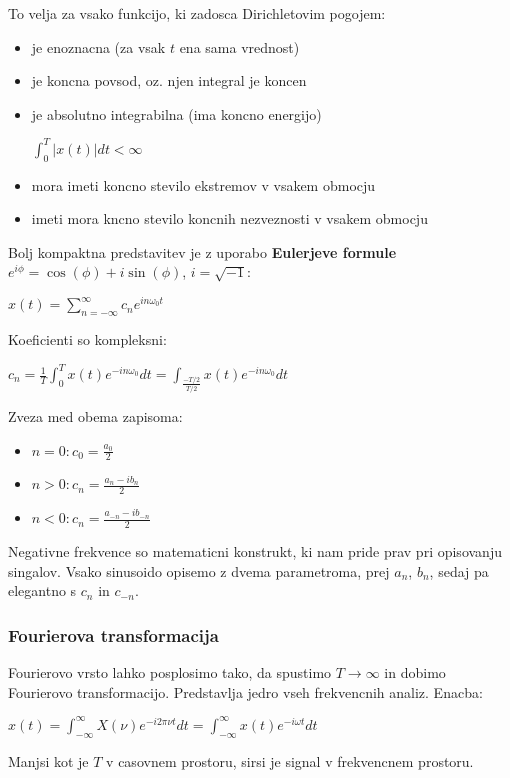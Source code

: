 \documentclass{article}
\begin{document}
\begin{multicols}{2}
	To velja za vsako funkcijo, ki zadosca Dirichletovim pogojem:
	\begin{itemize}
		\item je enoznacna (za vsak $t$ ena sama vrednost)
		\item je koncna povsod, oz. njen integral je koncen
		\item je absolutno integrabilna (ima koncno energijo)
		      \begin{center}
			      $\int_0^T |x(t)| dt < \infty$
		      \end{center}
		\item mora imeti koncno stevilo ekstremov v vsakem obmocju
		\item imeti mora kncno stevilo koncnih nezveznosti v vsakem obmocju
	\end{itemize}

	Bolj kompaktna predstavitev je z uporabo \textbf{Eulerjeve formule} $e^{i \phi} = \cos(\phi) + i \sin(\phi)$, $i = \sqrt{-1}$:
	\begin{center}
		\begin{math}
			x(t) = \sum_{n = - \infty}^{\infty} c_n e^{i n \omega_0 t}
		\end{math}
	\end{center}
	Koeficienti so kompleksni:
	\begin{center}
		\begin{math}
			c_n = \frac{1}{T} \int_0^T x(t)e^{-in \omega_0} dt = \int_{\frac{-T/2}{T/2}} x(t) e^{-in \omega_0} dt
		\end{math}
	\end{center}
	Zveza med obema zapisoma:
	\begin{itemize}
		\item $n = 0: c_0 = \frac{a_0}{2}$
		\item $n > 0: c_n = \frac{a_n - i b_n}{2}$
		\item $n < 0: c_n = \frac{a_{-n} - i b_{-n}}{2}$
	\end{itemize}

	Negativne frekvence so matematicni konstrukt, ki nam pride prav pri opisovanju singalov.
	Vsako sinusoido opisemo z dvema parametroma, prej $a_n$, $b_n$, sedaj pa elegantno
	s $c_n$ in $c_{-n}$.

	\subsubsection{Fourierova transformacija}
	Fourierovo vrsto lahko posplosimo tako, da spustimo $T \rightarrow \infty$ in dobimo Fourierovo transformacijo.
	Predstavlja jedro vseh frekvencnih analiz.
	Enacba:
	\begin{center}
		\begin{math}
			x(t) = \int_{-\infty}^{\infty} X(\nu)e^{-i2 \pi \nu t} dt = \int_{-\infty}^{\infty} x(t) e^{-i \omega t} dt
		\end{math}
	\end{center}
	Manjsi kot je $T$ v casovnem prostoru, sirsi je signal v frekvencnem prostoru.


\end{multicols}
\end{document}
